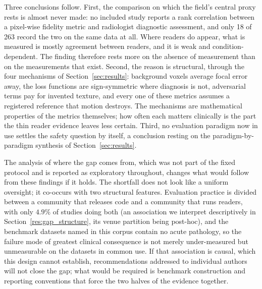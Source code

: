 \documentclass[review,authoryear]{elsarticle}
\begin{document}
Three conclusions follow. First, the comparison on which the field's central proxy
rests is almost never made: no included study reports a rank correlation between a
pixel-wise fidelity metric and radiologist diagnostic assessment, and only 18 of 263
record the two on the same data at all. Where readers do appear, what is measured is
mostly agreement between readers, and it is weak and condition-dependent. The finding
therefore rests more on the absence of measurement than on the measurements that exist. Second, the reason is
structural, through the four mechanisms of Section~\ref{sec:results}: background
voxels average focal error away, the loss functions are sign-symmetric where diagnosis
is not, adversarial terms pay for invented texture, and every one of these metrics
assumes a registered reference that motion destroys. The mechanisms are mathematical
properties of the metrics themselves; how often each matters clinically is the part
the thin reader evidence leaves less certain. Third, no evaluation paradigm now in use
settles the safety question by itself, a conclusion resting on the
paradigm-by-paradigm synthesis of Section~\ref{sec:results}.

The analysis of where the gap comes from, which was not part of the fixed protocol and
is reported as exploratory throughout, changes what would follow from these findings if
it holds. The shortfall does not look like a uniform oversight; it co-occurs with two
structural features. Evaluation practice is divided between a community that releases code and a
community that runs readers, with only $4.9\%$ of studies doing both (an association
we interpret descriptively in Section~\ref{res:gap_structure}, its venue partition being
post-hoc), and the benchmark datasets named in this corpus
contain no acute pathology, so the failure mode of greatest clinical consequence is
not merely under-measured but unmeasurable on the datasets in common use. If that
association is causal, which this design cannot establish, recommendations addressed
to individual authors will not close the gap; what would be required is benchmark
construction and reporting conventions that force the two halves of the evidence
together.
\end{document}
